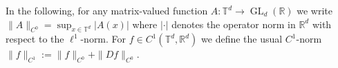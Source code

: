 \documentclass[12pt,reqno,a4paper]{amsart}%
\numberwithin{equation}{section}
\newtheorem{lemma}[theorem]{Lemma}
\newcommand{\A}{{\mathcal A}}
\newcommand{\Rr}{{\mathbb{R}}}
\newcommand{\Tt}{{\mathbb{T}}}
\def\e{\mathrm{e}}
\def\GL{\operatorname{GL}}
\newcommand{\id}  {\operatorname{id}}
\newcommand{\tcm}{\textcolor{magenta}}
\begin{document}
%
%
%	

In the following, for any matrix-valued function $A\colon \Tt^d\to \GL_d(\Rr)$ we write $\|A\|_{C^0}=\sup_{x\in\Tt^d}|A(x)|$ where $|\cdot|$ denotes the operator norm in $\Rr^d$ with respect to the $\ell^1$-norm.   For $f\in C^1(\Tt^d,\Rr^d)$ we define the usual $C^1$-norm $\|f\|_{C^1}:=\|f\|_{C^0}+\|Df\|_{C^0}$.  
\end{document}
